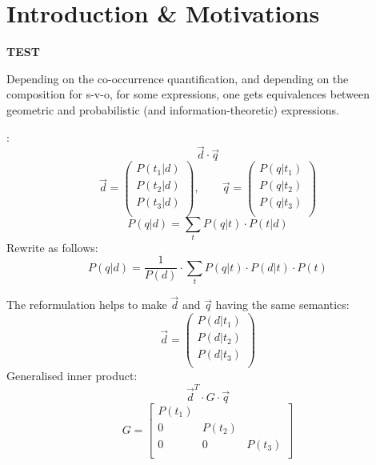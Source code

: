 \section{Introduction \& Motivations}




{\large \bf  TEST }


Depending on the co-occurrence quantification, and depending on the composition for s-v-o, for some expressions, one  gets equivalences between geometric and probabilistic (and information-theoretic) expressions.


\cite{Wong/Yao:95}:
\[
\vec{d} \cdot \vec{q}
\]
\[
\vec{d} =
	\left(
	\begin{matrix}
	P(t_1|d)\\
	P(t_2|d)\\
	P(t_3|d)\\
	\end{matrix}
	\right),
\qquad
\vec{q} =
	\left(
	\begin{matrix}
	P(q|t_1)\\
	P(q|t_2)\\
	P(q|t_3)\\
	\end{matrix}
	\right)
\]
\[
P(q|d) = \sum_t P(q|t) \cdot P(t|d)
\]
Rewrite as follows:
\[
P(q|d) = \frac{1}{P(d)} \cdot \sum_t P(q|t) \cdot P(d|t) \cdot P(t)
\]

The reformulation helps
to make $\vec{d}$ and $\vec{q}$ having the same semantics:
\[
\vec{d} =
	\left(
	\begin{matrix}
	P(d|t_1)\\
	P(d|t_2)\\
	P(d|t_3)\\
	\end{matrix}
	\right)
\]
Generalised inner product:
\[
\vec{d}^T \cdot G \cdot \vec{q}
\]
\[
G=
\left[
\begin{matrix}
P(t_1) \\
0 & P(t_2) \\
0 & 0 & P(t_3) \\
\end{matrix}
\right]
\]



